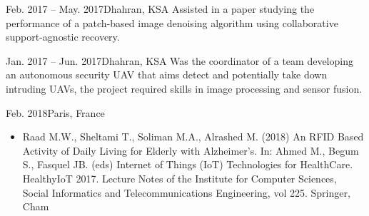 \documentclass[10pt,a4paper]{altacv}
\begin{document}

{Feb. 2017 -- May. 2017}{Dhahran, KSA}
Assisted in a paper studying the performance of a patch-based image denoising algorithm using collaborative support-agnostic recovery.



{Jan. 2017 -- Jun. 2017}{Dhahran, KSA}
Was the coordinator of a team developing an autonomous security UAV that aims detect and potentially take down intruding UAVs, the project required skills in image processing and sensor fusion. 

{Feb. 2018}{Paris, France}
  \begin{itemize}
  	\item {Raad M.W., Sheltami T., Soliman M.A., Alrashed M. (2018) An RFID Based Activity of Daily Living for Elderly with Alzheimer’s. In: Ahmed M., Begum S., Fasquel JB. (eds) Internet of Things (IoT) Technologies for HealthCare. HealthyIoT 2017. Lecture Notes of the Institute for Computer Sciences, Social Informatics and Telecommunications Engineering, vol 225. Springer, Cham}
  \end{itemize}
    







\end{document}
